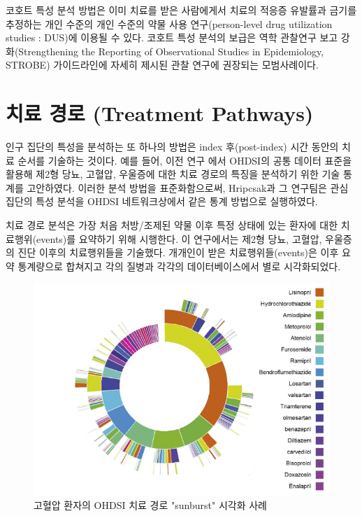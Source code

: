 \documentclass[11pt]{book}
\theoremstyle{definition}
\theoremstyle{definition}
\theoremstyle{definition}
\theoremstyle{remark}
\begin{document}
코호트 특성 분석 방법은 이미 치료를 받은 사람에게서 치료의 적응증
유발률과 금기를 추정하는 개인 수준의 개인 수준의 약물 사용
연구(person-level drug utilization studies : DUS)에 이용될 수 있다.
코호트 특성 분석의 보급은 역학 관찰연구 보고 강화(Strengthening the
Reporting of Observational Studies in Epidemiology, STROBE) 가이드라인에
자세히 제시된 관찰 연구에 권장되는 모범사례이다. \citep{VONELM2008344}

\section{치료 경로 (Treatment Pathways)}\label{--treatment-pathways}

인구 집단의 특성을 분석하는 또 하나의 방법은 index 후(post-index) 시간
동안의 치료 순서를 기술하는 것이다. 예를 들어, 이전 연구
\citep{Hripcsak7329} 에서 OHDSI의 공통 데이터 표준을 활용해 제2형 당뇨,
고혈압, 우울증에 대한 치료 경로의 특징을 분석하기 위한 기술 통계를
고안하였다. 이러한 분석 방법을 표준화함으로써, Hripcsak과 그 연구팀은
관심 집단의 특성 분석을 OHDSI 네트워크상에서 같은 통계 방법으로
실행하였다. 

치료 경로 분석은 가장 처음 처방/조제된 약물 이후 특정 상태에 있는 환자에
대한 치료행위(events)를 요약하기 위해 시행한다. 이 연구에서는 제2형
당뇨, 고혈압, 우울증의 진단 이후의 치료행위들을 기술했다. 개개인이 받은
치료행위들(events)은 이후 요약 통계량으로 합쳐지고 각의 질병과 각각의
데이터베이스에서 별로 시각화되었다.

\begin{figure}

{\centering \includegraphics[width=1\linewidth]{images/Characterization/pnasTreatmentPathwaysSunburst} 

}

\caption{고혈압 환자의 OHDSI 치료 경로 "sunburst" 시각화 사례}\label{fig:treatmentPathwaysSunburstDataViz}
\end{figure}
\end{document}
